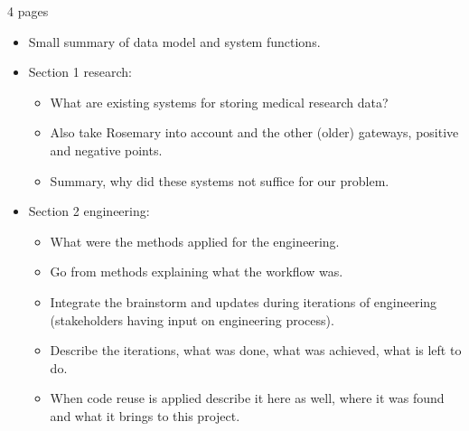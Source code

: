 4 pages

\begin{itemize}
	\item Small summary of data model and system functions.
	\item Section 1 research:
	\begin{itemize}
		\item What are existing systems for storing medical research data?
		\item Also take Rosemary into account and the other (older) gateways, positive and negative points.
		\item Summary, why did these systems not suffice for our problem.
	\end{itemize}
	\item Section 2 engineering:
	\begin{itemize}
		\item What were the methods applied for the engineering.
		\item Go from methods explaining what the workflow was.
		\item Integrate the brainstorm and updates during iterations of engineering (stakeholders having input on engineering process).
		\item Describe the iterations, what was done, what was achieved, what is left to do.
		\item When code reuse is applied describe it here as well, where it was found and what it brings to this project.
	\end{itemize}
\end{itemize}